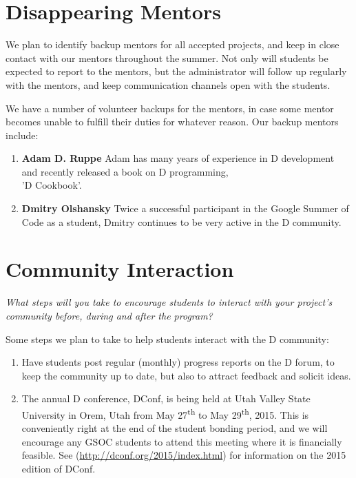 \documentclass[	DIV=calc,paper=a4,fontsize=11pt,twocolumn]{scrartcl}	%
\begin{document}
\section{Disappearing Mentors}

We plan to identify backup mentors for all accepted projects,
and keep in close contact with our mentors throughout the
summer.  Not only will students be expected to report to the mentors,
but the administrator will follow up regularly with the mentors, and
keep communication channels open with the students.

We have a number of volunteer backups for the mentors, in case
some mentor becomes unable to fulfill their duties for whatever
reason.  Our backup mentors include:

\begin{enumerate}
     \item \textbf{Adam D. Ruppe}  Adam has many years of experience in
     D development and recently released a book on D programming, \\
     'D Cookbook'.
     \item \textbf{Dmitry Olshansky}  Twice a successful participant
     in the Google Summer of Code as a student, Dmitry continues to be 
     very active in the D community. 
\end{enumerate}

\section{Community Interaction}
\emph{What steps will you take to encourage students to interact 
with your project's community before, during and after 
the program?}

Some steps we plan to take to help students interact with
the D community:

\begin{enumerate}
\item Have students post regular (monthly) progress reports
on the D forum, to keep the community up to date, but also
to attract feedback and solicit ideas.
\item The annual D conference, DConf, is being held at Utah
Valley State University in Orem, Utah from May 27\textsuperscript{th}
to May 29\textsuperscript{th}, 2015. This is conveniently right at 
the end of the student bonding period, and we will encourage any
GSOC students to attend this meeting where it is financially 
feasible. See (\url{http://dconf.org/2015/index.html}) for information on
the 2015 edition of DConf.
\end{enumerate}
\end{document}

